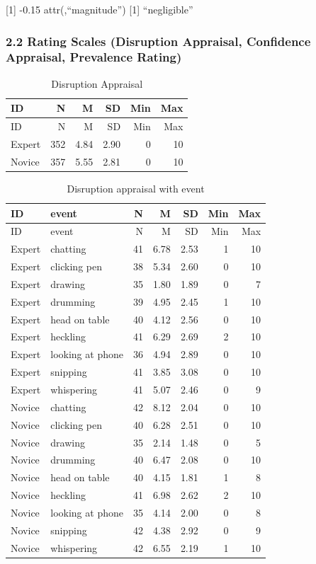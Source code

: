 \documentclass[
]{article}
\begin{document}
{[}1{]} -0.15 attr(,``magnitude'') {[}1{]} ``negligible''

\subsubsection{2.2 Rating Scales (Disruption Appraisal, Confidence
Appraisal, Prevalence
Rating)}\label{rating-scales-disruption-appraisal-confidence-appraisal-prevalence-rating}

\begin{longtable}[]{@{}lrrrrr@{}}
\caption{Disruption Appraisal}\tabularnewline
\toprule\noalign{}
ID & N & M & SD & Min & Max \\
\midrule\noalign{}
\endfirsthead
\toprule\noalign{}
ID & N & M & SD & Min & Max \\
\midrule\noalign{}
\endhead
\bottomrule\noalign{}
\endlastfoot
Expert & 352 & 4.84 & 2.90 & 0 & 10 \\
Novice & 357 & 5.55 & 2.81 & 0 & 10 \\
\end{longtable}

\begin{longtable}[]{@{}llrrrrr@{}}
\caption{Disruption appraisal with event}\tabularnewline
\toprule\noalign{}
ID & event & N & M & SD & Min & Max \\
\midrule\noalign{}
\endfirsthead
\toprule\noalign{}
ID & event & N & M & SD & Min & Max \\
\midrule\noalign{}
\endhead
\bottomrule\noalign{}
\endlastfoot
Expert & chatting & 41 & 6.78 & 2.53 & 1 & 10 \\
Expert & clicking pen & 38 & 5.34 & 2.60 & 0 & 10 \\
Expert & drawing & 35 & 1.80 & 1.89 & 0 & 7 \\
Expert & drumming & 39 & 4.95 & 2.45 & 1 & 10 \\
Expert & head on table & 40 & 4.12 & 2.56 & 0 & 10 \\
Expert & heckling & 41 & 6.29 & 2.69 & 2 & 10 \\
Expert & looking at phone & 36 & 4.94 & 2.89 & 0 & 10 \\
Expert & snipping & 41 & 3.85 & 3.08 & 0 & 10 \\
Expert & whispering & 41 & 5.07 & 2.46 & 0 & 9 \\
Novice & chatting & 42 & 8.12 & 2.04 & 0 & 10 \\
Novice & clicking pen & 40 & 6.28 & 2.51 & 0 & 10 \\
Novice & drawing & 35 & 2.14 & 1.48 & 0 & 5 \\
Novice & drumming & 40 & 6.47 & 2.08 & 0 & 10 \\
Novice & head on table & 40 & 4.15 & 1.81 & 1 & 8 \\
Novice & heckling & 41 & 6.98 & 2.62 & 2 & 10 \\
Novice & looking at phone & 35 & 4.14 & 2.00 & 0 & 8 \\
Novice & snipping & 42 & 4.38 & 2.92 & 0 & 9 \\
Novice & whispering & 42 & 6.55 & 2.19 & 1 & 10 \\
\end{longtable}
\end{document}
